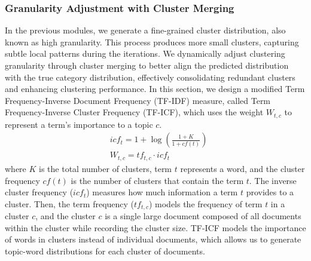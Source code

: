 \subsubsection{Granularity Adjustment with Cluster Merging}
In the previous modules, we generate a fine-grained cluster distribution, also known as high granularity. This process produces more small clusters, capturing subtle local patterns during the iterations. We dynamically adjust clustering granularity through cluster merging to better align the predicted distribution with the true category distribution, effectively consolidating redundant clusters and enhancing clustering performance. In this section, we design a modified Term Frequency-Inverse Document Frequency (TF-IDF) measure, called Term Frequency-Inverse Cluster Frequency (TF-ICF), which uses the weight $W_{t,c}$ to represent a term’s importance to a topic $c$. 
\begin{align}
&\label{idf}
    icf_{t} = 1 + \log \left(\frac{1 + K}{1 + cf(t)} \right) \\
&\label{tfidf}
    W_{t,c} = tf_{t,c} \cdot icf_{t}
\end{align}
where $K$ is the total number of clusters, term $t$ represents a word, and the cluster frequency $cf(t)$ is the number of clusters that contain the term $t$. The inverse cluster frequency ($icf_{t}$) measures how much information a term $t$ provides to a cluster. Then, the term frequency ($tf_{t,c}$) models the frequency of term $t$ in a cluster $c$, and the cluster $c$ is a single large document composed of all documents within the cluster while recording the cluster size. TF-ICF models the importance of words in clusters instead of individual documents, which allows us to generate topic-word distributions for each cluster of documents. 

